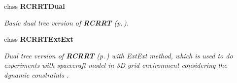 \begin{CompactItemize}
class {\bf RCRRTDual}
\begin{CompactList}\small\item\em Basic dual tree version of {\bf RCRRT} {\rm (p.\,\pageref{classRCRRT})}.\item\end{CompactList}\item 
class {\bf RCRRTExt\-Ext}
\begin{CompactList}\small\item\em Dual tree version of {\bf RCRRT} {\rm (p.\,\pageref{classRCRRT})} with Ext\-Ext method, which is used to do experiments with spacecraft model in 3D grid environment considering the dynamic constraints .\item\end{CompactList}\end{CompactItemize}
